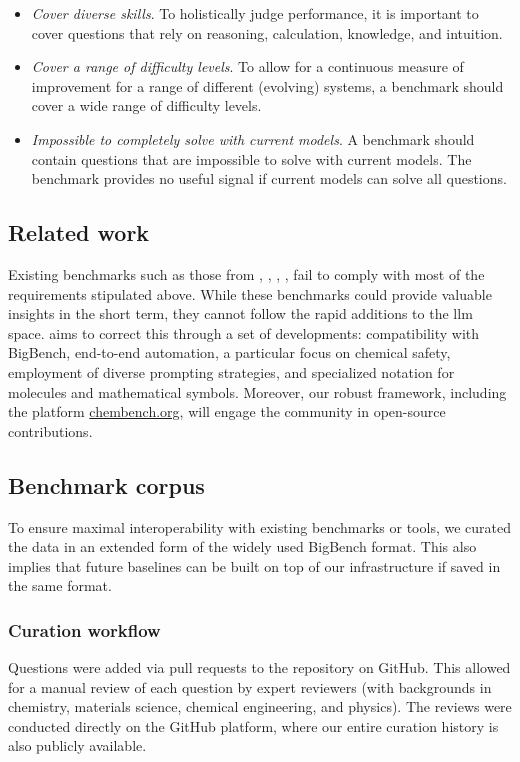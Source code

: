 \begin{itemize}
    \item \emph{Cover diverse skills}. To holistically judge performance, it is important to cover questions that rely on reasoning, calculation, knowledge, and intuition.
    \item \emph{Cover a range of difficulty levels}. To allow for a continuous measure of improvement for a range of different (evolving) systems, a benchmark should cover a wide range of difficulty levels.
    \item \emph{Impossible to completely solve with current models}. A benchmark should contain questions that are impossible to solve with current models. The benchmark provides no useful signal if current models can solve all questions.
\end{itemize}

\subsection{Related work}
Existing benchmarks such as those from \textcite{guo2023large}, \textcite{sun2023scieval}, \textcite{Schulze_Balhorn_2024}, \textcite{Cai_2024}, \textcite{rein2023gpqagraduatelevelgoogleproofqa} fail to comply with most of the requirements stipulated above.
While these benchmarks could provide valuable insights in the short term, they cannot follow the rapid additions to the \gls{llm} space.
\chembench aims to correct this through a set of developments: compatibility with BigBench, end-to-end automation, a particular focus on chemical safety, employment of diverse prompting strategies, and specialized notation for molecules and mathematical symbols.
Moreover, our robust framework, including the platform \url{chembench.org}, will engage the community in open-source contributions.

\clearpage
\subsection{Benchmark corpus}
To ensure maximal interoperability with existing benchmarks or tools, we curated the data in an extended form of the widely used BigBench format.\autocite{srivastava2022beyond}
This also implies that future baselines can be built on top of our infrastructure if saved in the same format.

\subsubsection{Curation workflow}
Questions were added via pull requests to the \chembench repository on GitHub.
This allowed for a manual review of each question by expert reviewers (with backgrounds in chemistry, materials science, chemical engineering, and physics).
The reviews were conducted directly on the GitHub platform, where our entire curation history is also publicly available.

